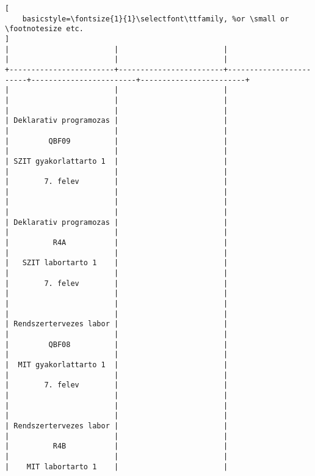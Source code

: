 \begin{lstlisting}[
    basicstyle=\fontsize{1}{1}\selectfont\ttfamily, %or \small or \footnotesize etc.
]
|                        |                        |                        |                        |                        | 
+------------------------+------------------------+------------------------+------------------------+------------------------+
|                        |                        |                        |                        |                        | 
|                        |                        |                        | Deklarativ programozas |                        | 
|                        |                        |                        |         QBF09          |                        | 
|                        |                        |                        | SZIT gyakorlattarto 1  |                        | 
|                        |                        |                        |        7. felev        |                        | 
|                        |                        |                        |                        |                        | 
|                        |                        |                        | Deklarativ programozas |                        | 
|                        |                        |                        |          R4A           |                        | 
|                        |                        |                        |   SZIT labortarto 1    |                        | 
|                        |                        |                        |        7. felev        |                        | 
|                        |                        |                        |                        |                        | 
|                        |                        |                        | Rendszertervezes labor |                        | 
|                        |                        |                        |         QBF08          |                        | 
|                        |                        |                        |  MIT gyakorlattarto 1  |                        | 
|                        |                        |                        |        7. felev        |                        | 
|                        |                        |                        |                        |                        | 
|                        |                        |                        | Rendszertervezes labor |                        | 
|                        |                        |                        |          R4B           |                        | 
|                        |                        |                        |    MIT labortarto 1    |                        | 

\end{lstlisting}
